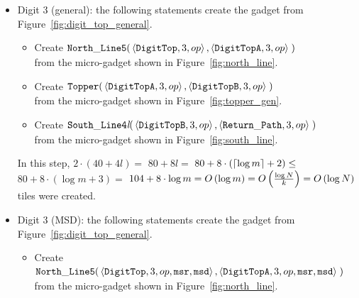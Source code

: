 \begin{itemize}
        \item Digit 3 (general): the following statements create the gadget from Figure~\ref{fig:digit_top_general}.
        \begin{itemize}
            \item Create
            $\begin{aligned}[t]
                {\tt North\_Line5}(& \left\langle {\tt DigitTop},  3, \inc \right\rangle,
                                     \left\langle {\tt DigitTopA}, 3, \inc \right\rangle \;)
            \end{aligned}$\\from the micro-gadget shown in Figure~\ref{fig:north_line}.

            \item Create
            $\begin{aligned}[t]
                {\tt Topper}(& \left\langle {\tt DigitTopA}, 3, \inc  \right\rangle,
                               \left\langle {\tt DigitTopB}, 3, \inc  \right\rangle \;)
            \end{aligned}$\\from the micro-gadget shown in Figure~\ref{fig:topper_gen}.

            \item Create
            $\begin{aligned}[t]
                {\tt South\_Line4\textit{l}}(& \left\langle {\tt DigitTopB}, 3, \inc \right\rangle,
                                               \left\langle \returnpath,     3, \inc \right\rangle \;)
            \end{aligned}$\\from the micro-gadget shown in Figure~\ref{fig:south_line}.
        \end{itemize}
        In this step, $2 \cdot \left( 40 + 4l \right) =$
        $80 + 8l =$
        $80 + 8 \cdot \left( \ceil*{\log m} + 2 \right) \leq$
        $80 + 8 \cdot \left( {\log m} + 3 \right) =$
        $104 + 8 \cdot {\log m} = \bigologm$ tiles were created.
        \vspace{0.5cm}


        \item Digit 3 (MSD): the following statements create the gadget from Figure~\ref{fig:digit_top_general}.
        \begin{itemize}
            \item Create
            $\begin{aligned}[t]
                {\tt North\_Line5}(& \left\langle {\tt DigitTop},  3, \inc, {\tt msr}, {\tt msd}\right\rangle,
                                     \left\langle {\tt DigitTopA}, 3, \inc, {\tt msr}, {\tt msd}\right\rangle \;)
            \end{aligned}$\\from the micro-gadget shown in Figure~\ref{fig:north_line}.


\end{itemize}
\end{itemize}
